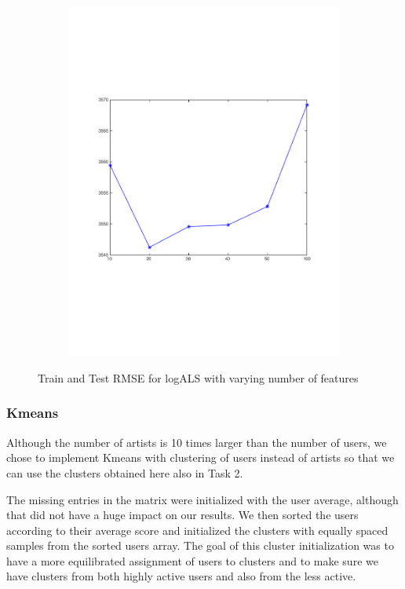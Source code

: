 \begin{figure}[h]
\begin{subfigure}[b]{0.45\textwidth}
    \includegraphics[width=\textwidth]{figures/als_test.pdf}
    \caption{}
  \end{subfigure}
  \caption{Train and Test RMSE for logALS with varying number of features}
  \label{fig:new_plot}
\end{figure}

\subsubsection{Kmeans}
Although the number of artists is 10 times larger than the number of users,
we chose to implement Kmeans with clustering of users 
instead of artists so that we can use the clusters obtained here also in Task 2.

The missing entries in the matrix were initialized with the user average, although that did not have a huge impact on our results. We then sorted the users according to their average score and initialized the clusters with equally spaced samples from the sorted users array. The goal of this cluster initialization was to have a more equilibrated assignment of users to clusters and to make sure we have clusters from both highly active users and also from the less active.

